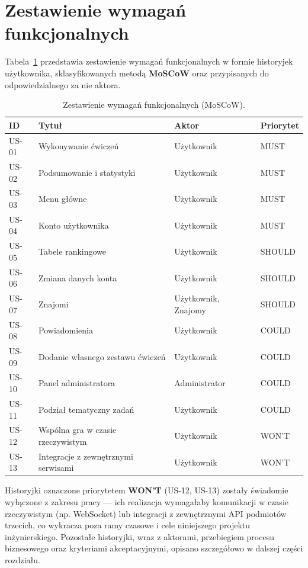 \documentclass[polish]{aghengthesis}
\begin{document}

\section{Zestawienie wymagań funkcjonalnych}
Tabela~\ref{tab:moscow} przedstawia zestawienie wymagań funkcjonalnych
w formie historyjek użytkownika, sklasyfikowanych metodą \textbf{MoSCoW}
oraz przypisanych do odpowiedzialnego za nie aktora.

\begin{table}[h!]
\centering
\caption{Zestawienie wymagań funkcjonalnych (MoSCoW).}
\label{tab:moscow}
\begin{tabularx}{\textwidth}{l X l l}
\toprule
ID & Tytuł & Aktor & Priorytet \\
\midrule
US-01 & Wykonywanie ćwiczeń & Użytkownik & MUST \\
US-02 & Podsumowanie i statystyki & Użytkownik & MUST \\
US-03 & Menu główne & Użytkownik & MUST \\
US-04 & Konto użytkownika & Użytkownik & MUST \\
US-05 & Tabele rankingowe & Użytkownik & SHOULD \\
US-06 & Zmiana danych konta & Użytkownik & SHOULD \\
US-07 & Znajomi & Użytkownik, Znajomy & SHOULD \\
US-08 & Powiadomienia & Użytkownik & COULD \\
US-09 & Dodanie własnego zestawu ćwiczeń & Użytkownik & COULD \\
US-10 & Panel administratora & Administrator & COULD \\
US-11 & Podział tematyczny zadań & Użytkownik & COULD \\
US-12 & Wspólna gra w czasie rzeczywistym & Użytkownik & WON'T \\
US-13 & Integracje z zewnętrznymi serwisami & Użytkownik & WON'T \\
\bottomrule
\end{tabularx}
\end{table}

Historyjki oznaczone priorytetem \textbf{WON'T} (US-12, US-13) zostały
świadomie wyłączone z zakresu pracy — ich realizacja wymagałaby komunikacji
w czasie rzeczywistym (np. WebSocket) lub integracji z zewnętrznymi API
podmiotów trzecich, co wykracza poza ramy czasowe i cele niniejszego
projektu inżynierskiego. Pozostałe historyjki, wraz z aktorami, przebiegiem
procesu biznesowego oraz kryteriami akceptacyjnymi, opisano szczegółowo
w dalszej części rozdziału.
\end{document}
